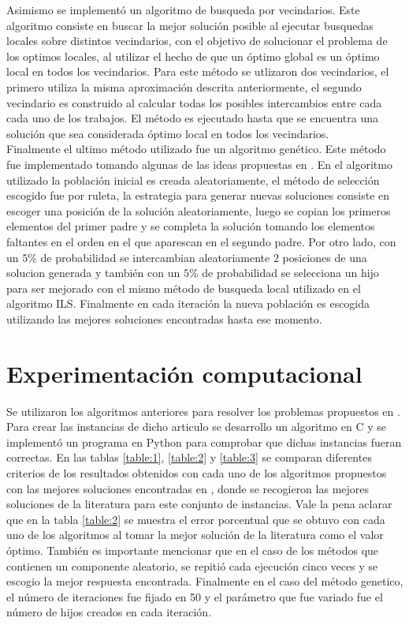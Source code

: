 \documentclass[10pt, twoside]{article}
\begin{document}
Asimismo se implementó un algoritmo de busqueda por vecindarios. Este
algoritmo consiste en buscar la mejor solución posible al ejecutar busquedas
locales sobre distintos vecindarios, con el objetivo de solucionar el problema
de los optimos locales, al utilizar el hecho de que un óptimo global es un óptimo
local en todos los vecindarios. Para este método se utlizaron dos vecindarios,
el primero utiliza la misma aproximación descrita anteriormente, el
segundo vecindario es construido al calcular todas los posibles
intercambios entre cada cada uno de los trabajos. El método es ejecutado hasta
que se encuentra una solución que sea considerada óptimo local en todos los
vecindarios.\\

Finalmente el ultimo método utilizado fue un algoritmo genético. Este método
fue implementado tomando algunas de las ideas propuestas en \cite{genetic2}.
En el algoritmo utilizado la población inicial es creada aleatoriamente,
el método de selección escogido fue por ruleta, la estrategia para generar
nuevas soluciones consiste en escoger una posición de la solución aleatoriamente,
luego se copian los primeros elementos del primer padre y se completa la solución
tomando los elementos faltantes en el orden en el que aparescan en el segundo padre.
Por otro lado, con un $5\%$ de probabilidad se intercambian aleatoriamente 2
posiciones de una solucion generada y también con un $5\%$ de probabilidad se
selecciona un hijo para ser mejorado con el mismo método de busqueda local
utilizado en el algoritmo ILS. Finalmente en cada iteración la nueva población
es escogida utilizando las mejores soluciones encontradas hasta ese momento. 

\section{Experimentación computacional}

Se utilizaron los algoritmos anteriores para resolver los problemas
propuestos en \cite{dataset}. Para crear las instancias de dicho articulo se desarrollo
un algoritmo en C y se implementó un programa en Python para comprobar que dichas
instancias fueran correctas. En las tablas \ref{table:1}, \ref{table:2} y
\ref{table:3} se comparan diferentes criterios de los resultados obtenidos con
cada uno de los algoritmos propuestos con las mejores soluciones encontradas en
\cite{literature}, donde se recogieron las mejores soluciones de la literatura para este
conjunto de instancias. Vale la pena aclarar que en la tabla \ref{table:2} se
muestra el error porcentual que se obtuvo con cada uno de los algoritmos al tomar la mejor
solución de la literatura como el valor óptimo. También es importante mencionar
que en el caso de los métodos que contienen un componente aleatorio, se repitió
cada ejecución cinco veces y se escogio la mejor respuesta encontrada. Finalmente
en el caso del método genetico, el número de iteraciones fue fijado en 50 y 
el parámetro que fue variado fue el número de hijos creados en cada iteración.
\end{document}

